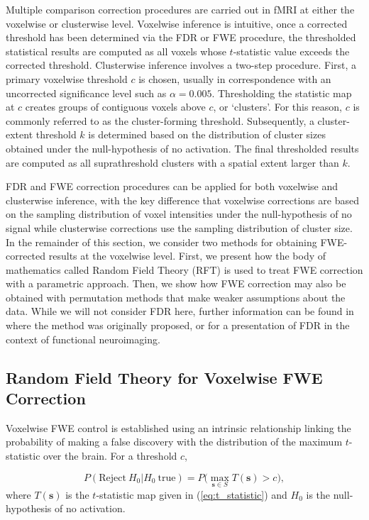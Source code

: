 Multiple comparison correction procedures are carried out in fMRI at either the voxelwise or clusterwise level. Voxelwise inference is intuitive, once a corrected threshold has been determined via the FDR or FWE procedure, the thresholded statistical results are computed as all voxels whose $t$-statistic value exceeds the corrected threshold. Clusterwise inference involves a two-step procedure. First, a primary voxelwise threshold $c$ is chosen, usually in correspondence with an uncorrected significance level such as $\alpha = 0.005$. Thresholding the statistic map at $c$ creates groups of contiguous voxels above $c$, or `clusters'. For this reason, $c$ is commonly referred to as the cluster-forming threshold. Subsequently, a cluster-extent threshold $k$ is determined based on the distribution of cluster sizes obtained under the null-hypothesis of no activation. The final thresholded results are computed as all suprathreshold clusters with a spatial extent larger than $k$. 

FDR and FWE correction procedures can be applied for both voxelwise and clusterwise inference, with the key difference that voxelwise corrections are based on the sampling distribution of voxel intensities under the null-hypothesis of no signal while clusterwise corrections use the sampling distribution of cluster size. In the remainder of this section, we consider two methods for obtaining FWE-corrected results at the voxelwise level. First, we present how the body of mathematics called Random Field Theory (RFT) is used to treat FWE correction with a parametric approach. Then, we show how FWE correction may also be obtained with permutation methods that make weaker assumptions about the data. While we will not consider FDR here, further information can be found in \citet*{Benjamini1995-yy} where the method was originally proposed, or \citet*{Genovese2002-xm} for a presentation of FDR in the context of functional neuroimaging. 

\subsection{Random Field Theory for Voxelwise FWE Correction}
\label{sec:RFT}

Voxelwise FWE control is established using an intrinsic relationship linking the probability of making a false discovery with the distribution of the maximum $t$-statistic over the brain. For a threshold $c$,

\begin{equation}
\label{eq:FWE_and_global_maximum}
P(\text{Reject} \ H_{0} | H_{0} \ \text{true}) = P\Big(\max\limits_{\bm{s} \in S} T(\bm{s}) > c \Big),
\end{equation}
where $T(\bm{s})$ is the $t$-statistic map given in (\ref{eq:t_statistic}) and $H_{0}$ is the null-hypothesis of no activation.

